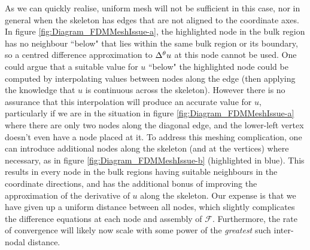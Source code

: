 As we can quickly realise, uniform mesh will not be sufficient in this case, nor in general when the skeleton has edges that are not aligned to the coordinate axes. 
In figure \ref{fig:Diagram_FDMMeshIssue-a}, the highlighted node in the bulk region has no neighbour ``below" that lies within the same bulk region or its boundary, so a centred difference approximation to $\Delta^{\theta}u$ at this node cannot be used.
One could argue that a suitable value for $u$ ``below" the highlighted node could be computed by interpolating values between nodes along the edge (then applying the knowledge that $u$ is continuous across the skeleton).
However there is no assurance that this interpolation will produce an accurate value for $u$, particularly if we are in the situation in figure \ref{fig:Diagram_FDMMeshIssue-a} where there are only two nodes along the diagonal edge, and the lower-left vertex doesn't even have a node placed at it.
To address this meshing complication, one can introduce additional nodes along the skeleton (and at the vertices) where necessary, as in figure \ref{fig:Diagram_FDMMeshIssue-b} (highlighted in blue).
This results in every node in the bulk regions having suitable neighbours in the coordinate directions, and has the additional bonus of improving the approximation of the derivative of $u$ along the skeleton.
Our expense is that we have given up a uniform distance between all nodes, which slightly complicates the difference equations at each node and assembly of $\mathcal{F}$.
Furthermore, the rate of convergence will likely now scale with some power of the \emph{greatest} such inter-nodal distance.

